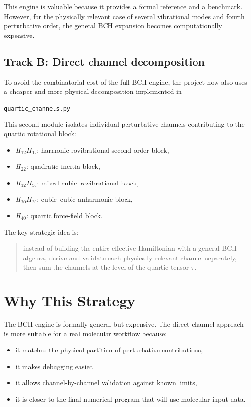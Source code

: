 \documentclass[11pt,a4paper]{article}
\begin{document}
This engine is valuable because it provides a formal reference and a benchmark. However, for the physically relevant case of several vibrational modes and fourth perturbative order, the general BCH expansion becomes computationally expensive.

\subsection{Track B: Direct channel decomposition}
To avoid the combinatorial cost of the full BCH engine, the project now also uses a cheaper and more physical decomposition implemented in
\begin{center}
\texttt{quartic\_channels.py}
\end{center}
This second module isolates individual perturbative channels contributing to the quartic rotational block:
\begin{itemize}[leftmargin=*]
\item \(H_{12}H_{12}\): harmonic rovibrational second-order block,
\item \(H_{22}\): quadratic inertia block,
\item \(H_{12}H_{30}\): mixed cubic--rovibrational block,
\item \(H_{30}H_{30}\): cubic--cubic anharmonic block,
\item \(H_{40}\): quartic force-field block.
\end{itemize}

The key strategic idea is:
\begin{quote}
instead of building the entire effective Hamiltonian with a general BCH algebra, derive and validate each physically relevant channel separately, then sum the channels at the level of the quartic tensor \( \tau \).
\end{quote}

\section{Why This Strategy}
The BCH engine is formally general but expensive. The direct-channel approach is more suitable for a real molecular workflow because:
\begin{itemize}[leftmargin=*]
\item it matches the physical partition of perturbative contributions,
\item it makes debugging easier,
\item it allows channel-by-channel validation against known limits,
\item it is closer to the final numerical program that will use molecular input data.
\end{itemize}
\end{document}

